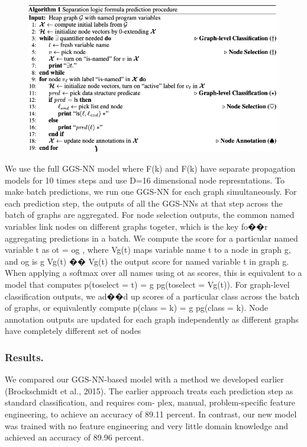 \documentclass{article}
\begin{document}
\begin{figure}[ht]
\vskip 0.2in
\begin{center}
\centerline{\includegraphics[width=\columnwidth]{Images/Bug1-4.png}}
\label{icml-historical}
\end{center}
\vskip -0.2in
\end{figure}
We use the full GGS-NN model where F(k) and F(k) have separate propagation models for 10 times steps and use D=16 dimensional node represntations. To make batch predictions, we run one GGS-NN for each graph simultaneously. For each prediction step, the outputs of all the GGS-NNs at that step across the batch of graphs are aggregated.
For node selection outputs, the common named variables link nodes on different graphs togeter,
which is the key fo��r aggregating predictions in a batch. We compute the score for a particular named
variable t as ot = og , where Vg(t) maps variable name t to a node in graph g, and og is g Vg(t) �� Vg(t)
the output score for named variable t in graph g. When applying a softmax over all names using ot as scores, this is equivalent to a model that computes p(toselect = t) = g pg(toselect = Vg(t)).
For graph-level classification outputs, we ad��d up scores of a particular class across the batch of graphs, or equivalently compute p(class = k) = g pg(class = k). Node annotation outputs are updated for each graph independently as different graphs have completely different set of nodes
\subsubsection{Results.}
We compared our GGS-NN-based model with a method we developed earlier (Brockschmidt et al., 2015). The earlier approach treats each prediction step as standard classification, and requires com- plex, manual, problem-specific feature engineering, to achieve an accuracy of 89.11 percent. In contrast, our new model was trained with no feature engineering and very little domain knowledge and achieved an accuracy of 89.96 percent.
\end{document}
